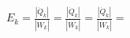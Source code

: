 \( E_k = \frac{|\dot{Q}_k|}{|\dot{W}_k|} = \frac{|\dot{Q}_k|}{|\dot{W}_k|} = \frac{|\dot{Q}_k|}{|\dot{W}_k|} = \)